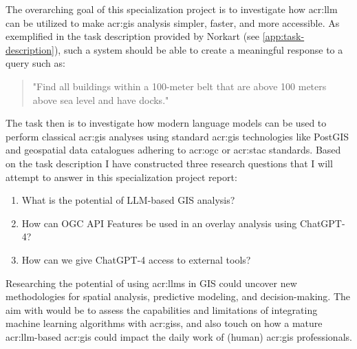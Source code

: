 The overarching goal of this specialization project is to investigate how \acrfull{acr:llm} can be utilized to make \acrshort{acr:gis} analysis simpler, faster, and more accessible. As exemplified in the task description provided by Norkart (see \cref{app:task-description}), such a system should be able to create a meaningful response to a query such as:

\begin{quote}
    "Find all buildings within a 100-meter belt that are above 100 meters above sea level and have docks."
\end{quote}

The task then is to investigate how modern language models can be used to perform classical \acrshort{acr:gis} analyses using standard \acrshort{acr:gis} technologies like PostGIS and geospatial data catalogues adhering to \acrshort{acr:ogc} or \acrshort{acr:stac} standards. Based on the task description I have constructed three research questions that I will attempt to answer in this specialization project report:

\begin{enumerate}
    \item What is the potential of LLM-based GIS analysis? \label{rq:llm-potential}
    \item How can OGC API Features be used in an overlay analysis using ChatGPT-4? \label{rq:overlay-analysis}
    \item How can we give ChatGPT-4 access to external tools? \label{rq:external-tools}
\end{enumerate}

Researching the potential of using \glspl{acr:llm} in GIS could uncover new methodologies for spatial analysis, predictive modeling, and decision-making. The aim with  would be to assess the capabilities and limitations of integrating machine learning algorithms with \glspl{acr:gis}, and also touch on how a mature \acrshort{acr:llm}-based \acrshort{acr:gis} could impact the daily work of (human) \acrshort{acr:gis} professionals.

